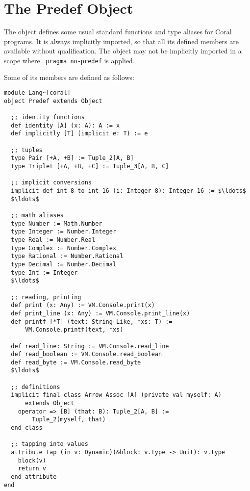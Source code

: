 \section{The Predef Object}
\label{sec:predef}

The  object defines some usual standard functions and type aliases for Coral programs. It is always implicitly imported, so that all its defined members are available without qualification. The  object may not be implicitly imported in a scope where ~\lstinline!pragma no-predef! is applied. 

Some of its members are defined as follows:

\begin{minipage}{\linewidth}
\begin{lstlisting}
module Lang~[coral]
object Predef extends Object

  ;; identity functions
  def identity [A] (x: A): A := x
  def implicitly [T] (implicit e: T) := e

  ;; tuples
  type Pair [+A, +B] := Tuple_2[A, B]
  type Triplet [+A, +B, +C] := Tuple_3[A, B, C]

  ;; implicit conversions
  implicit def int_8_to_int_16 (i: Integer_8): Integer_16 := $\ldots$
  $\ldots$

  ;; math aliases
  type Number := Math.Number
  type Integer := Number.Integer
  type Real := Number.Real
  type Complex := Number.Complex
  type Rational := Number.Rational
  type Decimal := Number.Decimal
  type Int := Integer
  $\ldots$
  
  ;; reading, printing
  def print (x: Any) := VM.Console.print(x)
  def print_line (x: Any) := VM.Console.print_line(x)
  def printf [*T] (text: String_Like, *xs: T) := 
      VM.Console.printf(text, *xs)
  
  def read_line: String := VM.Console.read_line
  def read_boolean := VM.Console.read_boolean
  def read_byte := VM.Console.read_byte
  $\ldots$
  
  ;; definitions
  implicit final class Arrow_Assoc [A] (private val myself: A)
      extends Object
    operator => [B] (that: B): Tuple_2[A, B] := 
        Tuple_2(myself, that)
  end class
  
  ;; tapping into values
  attribute tap (in v: Dynamic)(&block: v.type -> Unit): v.type
    block(v)
    return v
  end attribute
end
\end{lstlisting}
\end{minipage}






